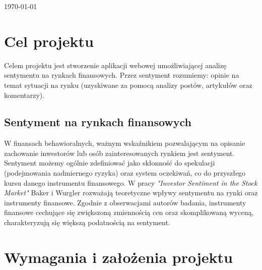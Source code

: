 \begin{titlepage}

\vspace*{\fill}

{\large \today}\\[2cm] %
\end{titlepage}
\newpage
\tableofcontents
\newpage
\section{Cel projektu}
Celem projektu jest stworzenie aplikacji webowej umożliwiającej analizę sentymentu na rynkach finansowych.
Przez sentyment rozumiemy: opinie na temat sytuacji na rynku (uzyskiwane za pomocą analizy postów, artykułów oraz komentarzy).
\subsection{Sentyment na rynkach finansowych}
W finansach behawioralnych, ważnym wskaźnikiem pozwalającym na opisanie zachowanie inwestorów lub osób zainteresowanych rynkiem jest sentyment. Sentyment możemy ogólnie zdefiniować jako skłonność do spekulacji (podejmowania nadmiernego ryzyka) oraz system oczekiwań, co do przyszłego kursu danego instrumentu finansowego. W pracy \textit{"Investor Sentiment in the Stock Market"} Baker i Wurgler rozważają teoretyczne wpływy sentymentu na rynki oraz instrumenty finansowe. Zgodnie z obserwacjami autorów badania, instrumenty finansowe cechujące się zwiększoną zmiennością cen oraz skomplikowaną wyceną, charakteryzują się większą podatnością na sentyment.
\section{Wymagania i założenia projektu}
